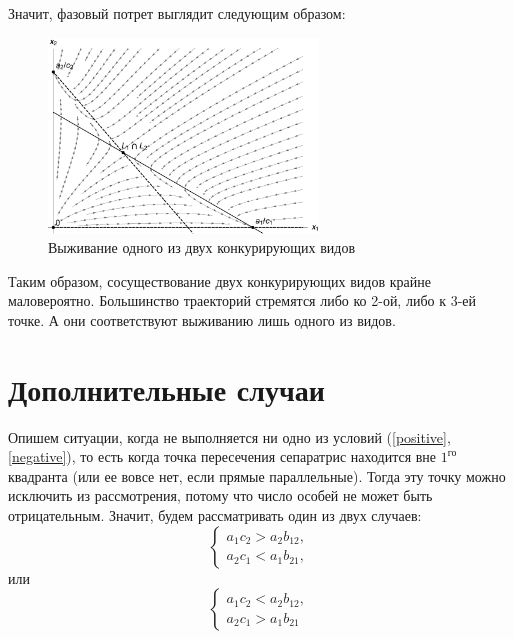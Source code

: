 \documentclass[12pt,a4paper]{article}
\begin{document}
    Значит, фазовый потрет выглядит следующим образом:
    \begin{figure}[h]
        \centering
        \includegraphics[width=0.64\textwidth]{phase_2.pdf}
        \caption{Выживание одного из двух конкурирующих видов}
        \label{fig:phase_2}
    \end{figure}

    Таким образом, сосуществование двух конкурирующих видов крайне маловероятно. Большинство траекторий стремятся либо ко 2-ой, либо к 3-ей точке. А они соответствуют выживанию лишь одного из видов.

    \section{Дополнительные случаи}
    Опишем ситуации, когда не выполняется ни одно из условий (\ref{positive},\,\ref{negative}), то есть когда точка пересечения сепаратрис находится вне $1^{\text{го}}$ квадранта (или ее вовсе нет, если прямые параллельные). Тогда эту точку можно исключить из рассмотрения, потому что число особей не может быть отрицательным. Значит, будем рассматривать один из двух случаев:
    \begin{equation}
        \label{posneg}
        \begin{cases}
            a_1 c_2 > a_2 b_{12},
            \\
            a_2 c_1 < a_1 b_{21},
        \end{cases}
    \end{equation}
    \noindent или
    \begin{equation}
        \label{negpos}
        \begin{cases}
            a_1 c_2 < a_2 b_{12},
            \\
            a_2 c_1 > a_1 b_{21}
        \end{cases}
    \end{equation}
\end{document}
